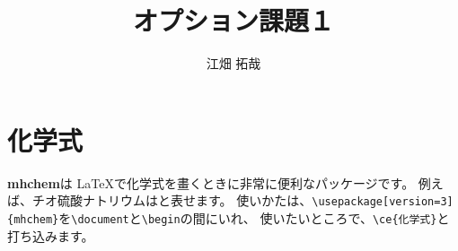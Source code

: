 \documentclass[aj4]{jbook}
\title{オプション課題１}
\author{江畑 拓哉}
\begin{document}
\section{化学式}
{\bf mhchem}は \LaTeX で化学式を畫くときに非常に便利なパッケージです。
例えば、チオ硫酸ナトリウムはと表せます。
使いかたは、\verb|\usepackage[version=3]{mhchem}|を\verb|\document|と\verb|\begin|の間にいれ、
使いたいところで、\verb|\ce{化学式}|と打ち込みます。
\end{document}
